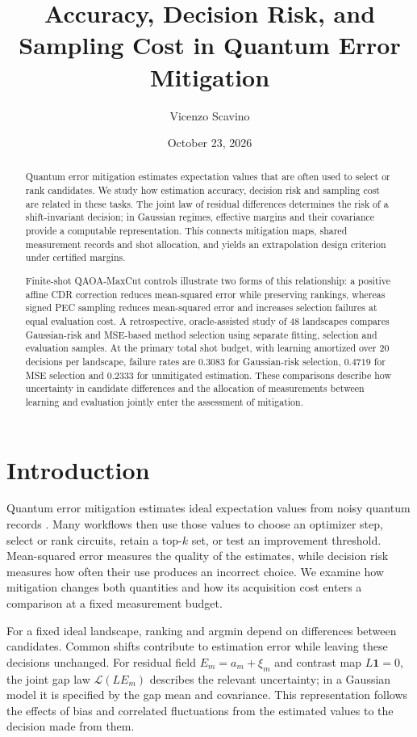 \documentclass[a4paper,onecolumn,unpublished,nopdfoutputerror]{quantumarticle}
\title{Accuracy, Decision Risk, and Sampling Cost in Quantum Error Mitigation}
\author{Vicenzo Scavino}
\affiliation{Independent Researcher}
\date{October 23, 2026}
\theoremstyle{plain}
\theoremstyle{definition}
\newcommand{\1}{\mathbf{1}}
\begin{document}
\begin{abstract}
Quantum error mitigation estimates expectation values that are often used to select or rank candidates. We study how estimation accuracy, decision risk and sampling cost are related in these tasks. The joint law of residual differences determines the risk of a shift-invariant decision; in Gaussian regimes, effective margins and their covariance provide a computable representation. This connects mitigation maps, shared measurement records and shot allocation, and yields an extrapolation design criterion under certified margins.

Finite-shot QAOA-MaxCut controls illustrate two forms of this relationship: a positive affine CDR correction reduces mean-squared error while preserving rankings, whereas signed PEC sampling reduces mean-squared error and increases selection failures at equal evaluation cost. A retrospective, oracle-assisted study of 48 landscapes compares Gaussian-risk and MSE-based method selection using separate fitting, selection and evaluation samples. At the primary total shot budget, with learning amortized over 20 decisions per landscape, failure rates are $0.3083$ for Gaussian-risk selection, $0.4719$ for MSE selection and $0.2333$ for unmitigated estimation. These comparisons describe how uncertainty in candidate differences and the allocation of measurements between learning and evaluation jointly enter the assessment of mitigation.

\end{abstract}
\maketitle

\section{Introduction}

Quantum error mitigation estimates ideal expectation values from noisy quantum records \cite{Cai2023}. Many workflows then use those values to choose an optimizer step, select or rank circuits, retain a top-$k$ set, or test an improvement threshold. Mean-squared error measures the quality of the estimates, while decision risk measures how often their use produces an incorrect choice. We examine how mitigation changes both quantities and how its acquisition cost enters a comparison at a fixed measurement budget.

For a fixed ideal landscape, ranking and argmin depend on differences between candidates. Common shifts contribute to estimation error while leaving these decisions unchanged. For residual field $E_m=a_m+\xi_m$ and contrast map $L\1=0$, the joint gap law $\mathcal L(LE_m)$ describes the relevant uncertainty; in a Gaussian model it is specified by the gap mean and covariance. This representation follows the effects of bias and correlated fluctuations from the estimated values to the decision made from them.
\end{document}
